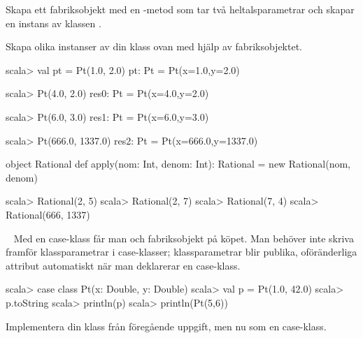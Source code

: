 \Subtask Skapa ett fabriksobjekt med en -metod som tar två heltalsparametrar och skapar en instans av klassen .

\Subtask Skapa olika instanser av din klass  ovan med hjälp av fabriksobjektet.


\SOLUTION


\TaskSolved \what


\SubtaskSolved
\begin{REPL}
scala> val pt = Pt(1.0, 2.0)
pt: Pt = Pt(x=1.0,y=2.0)

scala> Pt(4.0, 2.0)
res0: Pt = Pt(x=4.0,y=2.0)

scala> Pt(6.0, 3.0)
res1: Pt = Pt(x=6.0,y=3.0)

scala> Pt(666.0, 1337.0)
res2: Pt = Pt(x=666.0,y=1337.0)
\end{REPL}

\SubtaskSolved  {}

\SubtaskSolved  {}

\SubtaskSolved
\begin{REPLnonum}
object Rational {
def apply(nom: Int, denom: Int): Rational = new Rational(nom, denom)
}
\end{REPLnonum}

\SubtaskSolved
\begin{REPL}
scala> Rational(2, 5)
scala> Rational(2, 7)
scala> Rational(7, 4)
scala> Rational(666, 1337)
\end{REPL}


\QUESTEND









\QUESTBEGIN

\Task  \what~  Med en case-klass får man  och fabriksobjekt på köpet. Man behöver inte skriva  framför klassparametrar i case-klasser; klassparametrar blir publika, oföränderliga attribut automatiskt när man deklarerar en case-klass.

\begin{REPL}
scala> case class Pt(x: Double, y: Double)
scala> val p = Pt(1.0, 42.0)
scala> p.toString
scala> println(p)
scala> println(Pt(5,6))
\end{REPL}

\Subtask Implementera din klass  från föregående uppgift, men nu som en case-klass.

